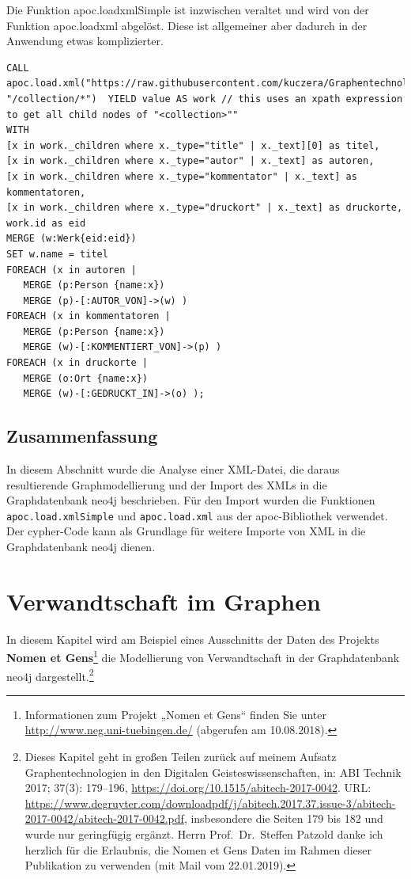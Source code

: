 Die Funktion apoc.loadxmlSimple ist inzwischen veraltet und wird von der
Funktion apoc.loadxml abgelöst. Diese ist allgemeiner aber dadurch in
der Anwendung etwas komplizierter.

\begin{verbatim}
CALL
apoc.load.xml("https://raw.githubusercontent.com/kuczera/Graphentechnologien/master/docs/data/kollatz.xml", "/collection/*")  YIELD value AS work // this uses an xpath expression to get all child nodes of "<collection>""
WITH
[x in work._children where x._type="title" | x._text][0] as titel,
[x in work._children where x._type="autor" | x._text] as autoren,
[x in work._children where x._type="kommentator" | x._text] as kommentatoren,
[x in work._children where x._type="druckort" | x._text] as druckorte,
work.id as eid
MERGE (w:Werk{eid:eid})
SET w.name = titel
FOREACH (x in autoren |
   MERGE (p:Person {name:x})
   MERGE (p)-[:AUTOR_VON]->(w) )
FOREACH (x in kommentatoren |
   MERGE (p:Person {name:x})
   MERGE (w)-[:KOMMENTIERT_VON]->(p) )
FOREACH (x in druckorte |
   MERGE (o:Ort {name:x})
   MERGE (w)-[:GEDRUCKT_IN]->(o) );
\end{verbatim}

\hypertarget{zusammenfassung-3}{%
\subsection{Zusammenfassung}\label{zusammenfassung-3}}

In diesem Abschnitt wurde die Analyse einer XML-Datei, die daraus
resultierende Graphmodellierung und der Import des XMLs in die
Graphdatenbank neo4j beschrieben. Für den Import wurden die Funktionen
\texttt{apoc.load.xmlSimple} und \texttt{apoc.load.xml} aus der
apoc-Bibliothek verwendet. Der cypher-Code kann als Grundlage für
weitere Importe von XML in die Graphdatenbank neo4j dienen.

\hypertarget{verwandtschaft-im-graphen}{%
\section{Verwandtschaft im Graphen}\label{verwandtschaft-im-graphen}}

In diesem Kapitel wird am Beispiel eines Ausschnitts der Daten des
Projekts \textbf{Nomen et Gens}\footnote{Informationen zum Projekt
  „Nomen et Gens`` finden Sie unter
  \url{http://www.neg.uni-tuebingen.de/} (abgerufen am 10.08.2018).} die
Modellierung von Verwandtschaft in der Graphdatenbank neo4j
dargestellt.\footnote{Dieses Kapitel geht in großen Teilen zurück auf
  meinem Aufsatz Graphentechnologien in den Digitalen
  Geisteswissenschaften, in: ABI Technik 2017; 37(3): 179--196,
  \url{https://doi.org/10.1515/abitech-2017-0042}. URL:
  \url{https://www.degruyter.com/downloadpdf/j/abitech.2017.37.issue-3/abitech-2017-0042/abitech-2017-0042.pdf},
  insbesondere die Seiten 179 bis 182 und wurde nur geringfügig ergänzt.
  Herrn Prof.~Dr.~Steffen Patzold danke ich herzlich für die Erlaubnis,
  die Nomen et Gens Daten im Rahmen dieser Publikation zu verwenden (mit
  Mail vom 22.01.2019).}

